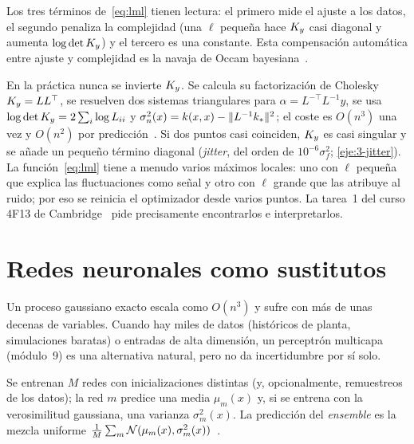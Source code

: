 Los tres términos de~\eqref{eq:lml} tienen lectura: el primero mide el ajuste a los datos, el segundo penaliza la complejidad (una $\ell$ pequeña hace $K_{y}$ casi diagonal y aumenta $\log\det K_{y}$) y el tercero es una constante. Esta compensación automática entre ajuste y complejidad es la navaja de Occam bayesiana~\cite[cap.~5]{rw}.

\begin{observacion}\label{obs:cholesky}
En la práctica nunca se invierte $K_{y}$. Se calcula su factorización de Cholesky $K_{y}=LL^\top$, se resuelven dos sistemas triangulares para $\alpha=L^{-\top}L^{-1}y$, se usa $\log\det K_{y}=2\sum_i\log L_{ii}$ y $\sigma_n^2(x)=k(x,x)-\lVert L^{-1}k_*\rVert^2$; el coste es $O(n^3)$ una vez y $O(n^2)$ por predicción~\cite[cap.~2]{rw}. Si dos puntos casi coinciden, $K_{y}$ es casi singular y se añade un pequeño término diagonal (\emph{jitter}, del orden de $10^{-6}\sigma_f^2$; \cref{eje:3-jitter}). La función~\eqref{eq:lml} tiene a menudo varios máximos locales: uno con $\ell$ pequeña que explica las fluctuaciones como señal y otro con $\ell$ grande que las atribuye al ruido; por eso se reinicia el optimizador desde varios puntos. La tarea~1 del curso 4F13 de Cambridge~\cite{cam4f13} pide precisamente encontrarlos e interpretarlos.
\end{observacion}

\addtocounter{definicion}{1}%

\section{Redes neuronales como sustitutos}

Un proceso gaussiano exacto escala como $O(n^3)$ y sufre con más de unas decenas de variables. Cuando hay miles de datos (históricos de planta, simulaciones baratas) o entradas de alta dimensión, un perceptrón multicapa (módulo~9) es una alternativa natural, pero no da incertidumbre por sí solo.

\begin{definicion}\label{def:ensemble}
Se entrenan $M$ redes con inicializaciones distintas (y, opcionalmente, remuestreos de los datos); la red $m$ predice una media $\mu_m(x)$ y, si se entrena con la verosimilitud gaussiana, una varianza $\sigma_m^2(x)$. La predicción del \emph{ensemble} es la mezcla uniforme $\frac1M\sum_m\mathcal{N}(\mu_m(x),\sigma_m^2(x))$~\cite{lakshmi}.
\end{definicion}

